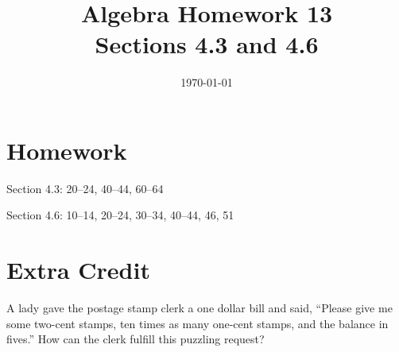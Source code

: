 \documentclass[letterpaper, landscape]{exam}
\title{Algebra Homework 13 \\ Sections 4.3 and 4.6}
\author{}
\date{\today}
\begin{document}
  \maketitle

  \section{Homework}

  \begin{itemize*}
    \item Section 4.3: 20--24, 40--44, 60--64
    \item Section 4.6: 10--14, 20--24, 30--34, 40--44, 46, 51
  \end{itemize*}

  \section{Extra Credit}

  A lady gave the postage stamp clerk a one dollar bill and said, ``Please give
  me some two-cent stamps, ten times as many one-cent stamps, and the balance
  in fives.''  How can the clerk fulfill this puzzling request?
\end{document}
